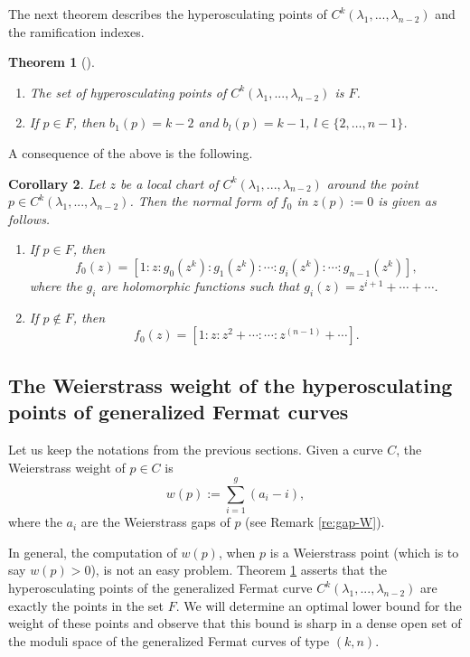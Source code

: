 \documentclass{amsart}
\newcommand{\C}[3]{\ensuremath{C^{#1}(#3_1,...,#3_{#2})}}
\newtheorem{theorem}{Theorem}
\newtheorem{corollary}[theorem]{Corollary}
\begin{document}
The next theorem describes the hyperosculating points of $\C{k}{n-2}{\lambda}$ and the ramification indexes.

\begin{theorem}[\cite{HKLP16}]\label{th:hyperosc}
\mbox{}
\begin{enumerate}
\item The set of hyperosculating points of $\C{k}{n-2}{\lambda}$ is $F$. 
\item  If $p\in F$, then $b_1(p)=k-2$ and $b_l(p)=k-1$,  $l \in \{2,\ldots, n-1\}$.
\end{enumerate}
\end{theorem}
 
A consequence of the above is the following.

\begin{corollary}\label{co:hyperosc}
Let $z$ be  a local chart of  $\C{k}{n-2}{\lambda}$  around the point  $p\in \C{k}{n-2}{\lambda}$. Then the normal form of 
$f_0$ in  $z(p):=0$  is given as follows.
\begin{enumerate}
\item If $p\in F$, then 
$$f_0(z)=[1:z: g_0(z^{k}):g_1(z^{k}):\cdots :g_{i}(z^{k}):\cdots : g_{n-1}(z^{k})],$$
where the  $g_i$ are holomorphic functions such that $g_i(z)=z^{i+1}+\cdots+\cdots$.

\item If $p\not \in F$, then  
$$f_0(z)=[1:z: z^2+\cdots :\cdots : z^{(n-1)}+\cdots].$$
\end{enumerate}
\end{corollary}



\subsection{The Weierstrass  weight of the hyperosculating points of generalized Fermat curves}
\label{ssec:aut-hiposc}
Let us keep the notations from the previous sections.  
Given a curve $C$, the Weierstrass  weight  of $p\in C$ is 
$$w(p):=\sum_{i=1}^{g}(a_i-i),$$
where the $a_i$ are the Weierstrass gaps of $p$ (see  Remark \ref{re:gap-W}).

In general, the computation of $w(p)$, when $p$ is a Weierstrass point (which is to say $w(p)>0$), 
is not an easy problem. Theorem  \ref{th:hyperosc} asserts that the hyperosculating points of the 
generalized Fermat curve  $\C{k}{n-2}{\lambda}$ are exactly the points in the set $F$.
We will determine an optimal lower bound for the weight of these points and observe that 
this bound is sharp in a  dense open set of the moduli space of the generalized Fermat curves of type $(k,n)$.\\
\end{document}
